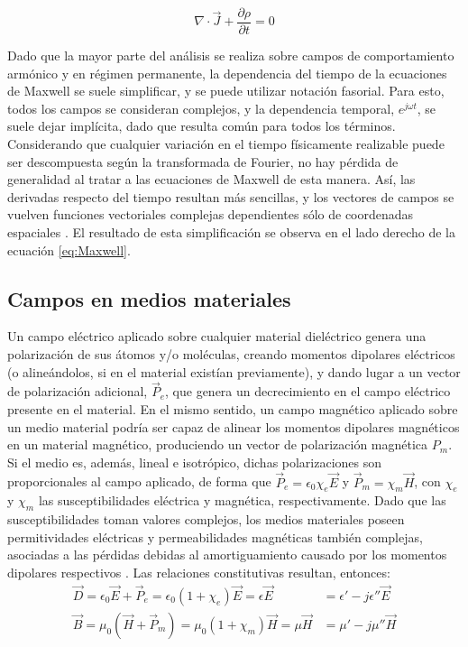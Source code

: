 \begin{equation}
	\label{eq:continuidad}
	\nabla \cdot \vec{J} + \frac{\partial \rho}{\partial t} = 0
\end{equation}

Dado que la mayor parte del análisis se realiza sobre campos de comportamiento armónico y en régimen permanente, la dependencia del tiempo de la ecuaciones de Maxwell se suele simplificar, y se puede utilizar notación fasorial. Para esto, todos los campos se consideran complejos, y la dependencia temporal, $e^{j \omega t}$, se suele dejar implícita, dado que resulta común para todos los términos. Considerando que cualquier variación en el tiempo físicamente realizable puede ser descompuesta según la transformada de Fourier, no hay pérdida de generalidad al tratar a las ecuaciones de Maxwell de esta manera. Así, las derivadas respecto del tiempo resultan más sencillas, y los vectores de campos se vuelven funciones vectoriales complejas dependientes sólo de coordenadas espaciales \cite{Collin:GuidedWaves}. El resultado de esta simplificación se observa en el lado derecho de la ecuación \ref{eq:Maxwell}.

\subsection{Campos en medios materiales}
\label{subsec_campos_en_dielectricos}

Un campo eléctrico aplicado sobre cualquier material dieléctrico genera una polarización de sus átomos y/o moléculas, creando momentos dipolares eléctricos (o alineándolos, si en el material existían previamente), y dando lugar a un vector de polarización adicional, $\vec{P}_e$, que genera un decrecimiento en el campo eléctrico presente en el material. En el mismo sentido, un campo magnético aplicado sobre un medio material podría ser capaz de alinear los momentos dipolares magnéticos en un material magnético, produciendo un vector de polarización magnética $P_m$. Si el medio es, además, lineal e isotrópico, dichas polarizaciones son proporcionales al campo aplicado, de forma que $\vec{P}_e = \epsilon_0 \chi_e \vec{E}$ y $\vec{P}_m = \chi_m \vec{H}$, con $\chi_e$ y $\chi_m$ las susceptibilidades eléctrica y magnética, respectivamente. Dado que las susceptibilidades toman valores complejos, los medios materiales poseen permitividades eléctricas y permeabilidades magnéticas también complejas, asociadas a las pérdidas debidas al amortiguamiento causado por los momentos dipolares respectivos \cite{Fernandez:Electromag}. Las relaciones constitutivas resultan, entonces:
\begin{subequations}
	\label{eq:polarization_vector}
	\begin{align}
		\vec{D} = \epsilon_0 \vec{E} + \vec{P}_e = \epsilon_0 (1+\chi_e)\vec{E} = \epsilon \vec{E} &= \epsilon' - j \epsilon'' \vec{E}\\
		\vec{B} = \mu_0 (\vec{H} + \vec{P}_m) = \mu_0 (1+\chi_m)\vec{H} = \mu \vec{H} &= \mu' - j \mu''\vec{H}
	\end{align}
\end{subequations}

